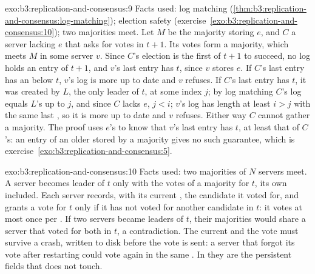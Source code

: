 \begin{solution}{exo:b3:replication-and-consensus:9}
Facts used: log matching (\cref{thm:b3:replication-and-consensus:log-matching}); election safety (exercise~\ref{exo:b3:replication-and-consensus:10}); two majorities meet. Let $M$ be the majority storing $e$, and $C$ a server lacking $e$ that asks for votes in  $t + 1$. Its votes form a majority, which meets $M$ in some server $v$. Since $C$'s election is the first of  $t + 1$ to succeed, no log holds an entry of  $t + 1$, and $v$'s last entry has  $t$, since $v$ stores $e$. If $C$'s last entry has an  below $t$, $v$'s log is more up to date and $v$ refuses. If $C$'s last entry has  $t$, it was created by $L$, the only leader of $t$, at some index $j$; by log matching $C$'s log equals $L$'s up to $j$, and since $C$ lacks $e$, $j < i$; $v$'s log has length at least $i > j$ with the same last , so it is more up to date and $v$ refuses. Either way $C$ cannot gather a majority. The proof uses $e$'s  to know that $v$'s last entry has  $t$, at least that of $C$'s: an entry of an older  stored by a majority gives no such guarantee, which is exercise~\ref{exo:b3:replication-and-consensus:5}.
\end{solution}

\begin{solution}{exo:b3:replication-and-consensus:10}
Facts used: two majorities of $N$ servers meet. A server becomes leader of  $t$ only with the votes of a majority for $t$, its own included. Each server records, with its current , the candidate it voted for, and grants a vote for $t$ only if it has not voted for another candidate in $t$: it votes at most once per . If two servers became leaders of $t$, their majorities would share a server that voted for both in $t$, a contradiction. The current  and the vote must survive a crash, written to disk before the vote is sent: a server that forgot its vote after restarting could vote again in the same . In  they are the persistent fields that  does not touch.
\end{solution}

